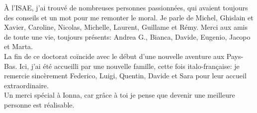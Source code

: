À l'ISAE, j'ai trouvé de nombreuses personnes passionnées, qui avaient toujours des conseils et un mot pour me remonter le moral. Je parle de Michel, Ghislain et Xavier, Caroline, Nicolas, Michelle, Laurent, Guillame et Rémy. Merci aux amis de toute une vie, toujours présents: Andrea G., Bianca, Davide, Eugenio, Jacopo et Marta. \\

La fin de ce doctorat co\"incide avec le début d'une nouvelle aventure aux Pays-Bas. Ici, j'ai été accueilli par une nouvelle famille, cette fois italo-fran\c{c}aise: je remercie sincèrement Federico, Luigi, Quentin, Davide et Sara pour leur accueil extraordinaire. \\

Un merci spécial à Ionna, car grâce à toi je pense que devenir une meilleure personne est  réalisable.
